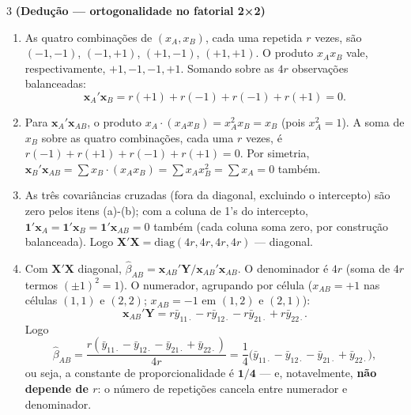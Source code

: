 \documentclass[11pt]{article}
\begin{document}
\begin{questao}{3} \textbf{(Dedução --- ortogonalidade no fatorial 2×2)}
\end{questao}
\begin{solucao}
\begin{enumerate}[label=(\alph*)]
  \item As quatro combinações de $(x_A,x_B)$, cada uma repetida $r$ vezes, são $(-1,-1)$,
    $(-1,+1)$, $(+1,-1)$, $(+1,+1)$. O produto $x_Ax_B$ vale, respectivamente, $+1,-1,-1,+1$.
    Somando sobre as $4r$ observações balanceadas:
    $$\mathbf{x}_A'\mathbf{x}_B = r(+1) + r(-1) + r(-1) + r(+1) = 0.$$
  \item Para $\mathbf{x}_A'\mathbf{x}_{AB}$, o produto $x_A \cdot (x_Ax_B) = x_A^2 x_B = x_B$
    (pois $x_A^2=1$). A soma de $x_B$ sobre as quatro combinações, cada uma $r$ vezes, é
    $r(-1)+r(+1)+r(-1)+r(+1)=0$. Por simetria, $\mathbf{x}_B'\mathbf{x}_{AB} =
    \sum x_B\cdot(x_Ax_B) = \sum x_A x_B^2 = \sum x_A = 0$ também.
  \item As três covariâncias cruzadas (fora da diagonal, excluindo o intercepto) são zero pelos
    itens (a)-(b); com a coluna de 1's do intercepto, $\mathbf{1}'\mathbf{x}_A =
    \mathbf{1}'\mathbf{x}_B = \mathbf{1}'\mathbf{x}_{AB}=0$ também (cada coluna soma zero, por
    construção balanceada). Logo $\mathbf{X}'\mathbf{X} = \mathrm{diag}(4r, 4r, 4r, 4r)$ ---
    diagonal.
  \item Com $\mathbf{X}'\mathbf{X}$ diagonal, $\hat\beta_{AB} =
    \mathbf{x}_{AB}'\mathbf{Y}/\mathbf{x}_{AB}'\mathbf{x}_{AB}$. O denominador é $4r$ (soma de
    $4r$ termos $(\pm1)^2=1$). O numerador, agrupando por célula ($x_{AB}=+1$ nas células
    $(1,1)$ e $(2,2)$; $x_{AB}=-1$ em $(1,2)$ e $(2,1)$):
    $$\mathbf{x}_{AB}'\mathbf{Y} = r\bar y_{11\cdot} - r\bar y_{12\cdot} - r\bar y_{21\cdot} +
    r\bar y_{22\cdot}.$$
    Logo
    $$\hat\beta_{AB} = \frac{r(\bar y_{11\cdot}-\bar y_{12\cdot}-\bar y_{21\cdot}+\bar
    y_{22\cdot})}{4r} = \frac{1}{4}\big(\bar y_{11\cdot}-\bar y_{12\cdot}-\bar y_{21\cdot}+\bar
    y_{22\cdot}\big),$$
    ou seja, a constante de proporcionalidade é $\boldsymbol{1/4}$ --- e, notavelmente, \textbf{não
    depende de $r$}: o número de repetições cancela entre numerador e denominador.
\end{enumerate}
\end{solucao}
\end{document}
